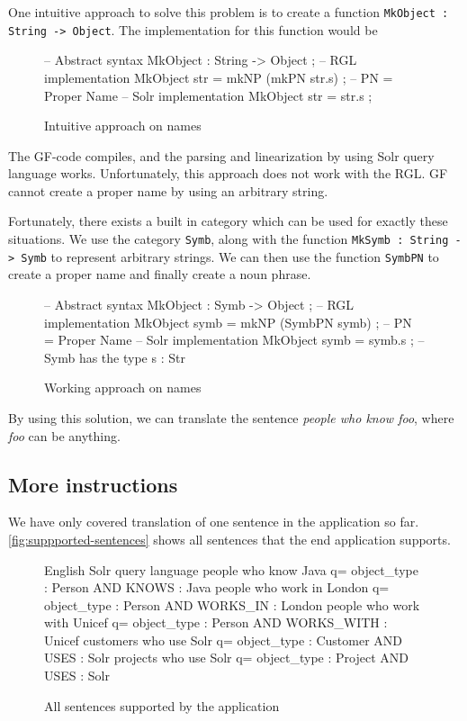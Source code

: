 One intuitive approach to solve this problem is to create a function \texttt{MkObject : String -> Object}. The implementation for this function would be 
\begin{figure}[H]
\begin{code}
-- Abstract syntax
MkObject : String -> Object ;
-- RGL implementation
MkObject str = mkNP (mkPN str.s) ; -- PN = Proper Name
-- Solr implementation
MkObject str = str.s ;
\end{code}
\caption{Intuitive approach on names}
\end{figure}

The GF-code compiles, and the parsing and linearization by using Solr query language works. Unfortunately, this approach does not work with the RGL. GF cannot create a proper name by using an arbitrary string. 

Fortunately, there exists a built in category which can be used for exactly these situations. We use the category \texttt{Symb}, along with the function \texttt{MkSymb : String -> Symb} to represent arbitrary strings. We can then use the function \texttt{SymbPN} to create a proper name and finally create a noun phrase.
\begin{figure}[H]
\begin{code}
-- Abstract syntax
MkObject : Symb -> Object ;
-- RGL implementation
MkObject symb = mkNP (SymbPN symb) ; -- PN = Proper Name
-- Solr implementation
MkObject symb = symb.s ; -- Symb has the type { s : Str }
\end{code}
\caption{Working approach on names}
\end{figure}

By using this solution, we can translate the sentence \emph{people who know foo}, where \emph{foo} can be anything.

\subsection{More instructions}\label{sec:more-instructions}
We have only covered translation of one sentence in the application so far. \autoref{fig:suppported-sentences} shows all sentences that the end application supports.
\begin{figure}[H]
\begin{terminal}
English                        Solr query language
people who know Java           q= object_type : Person AND KNOWS : Java
people who work in London      q= object_type : Person AND WORKS_IN : London
people who work with Unicef    q= object_type : Person AND WORKS_WITH : Unicef
customers who use Solr         q= object_type : Customer AND USES : Solr
projects who use Solr          q= object_type : Project AND USES : Solr
\end{terminal}
\caption{All sentences supported by the application\label{fig:suppported-sentences}}
\end{figure}

